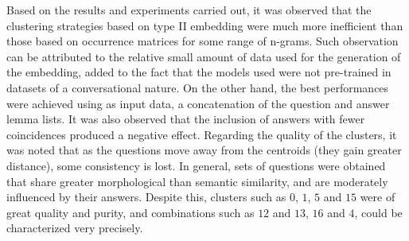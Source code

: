 Based on the results and experiments carried out, it was observed that the clustering strategies based on type II embedding were much more inefficient than those based on occurrence matrices for some range of n-grams. Such observation can be attributed to the relative small amount of data used for the generation of the embedding, added to the fact that the models used were not pre-trained in datasets of a conversational nature.
On the other hand, the best performances were achieved using as input data, a concatenation of the question and answer lemma lists. It was also observed that the inclusion of answers with fewer coincidences produced a negative effect.
Regarding the quality of the clusters, it was noted that as the questions move away from the centroids (they gain greater distance), some consistency is lost. In general, sets of questions were obtained that share greater morphological than semantic similarity, and are moderately influenced by their answers. Despite this, clusters such as $0$, $1$, $5$ and $15$ were of great quality and purity, and combinations such as $12$ and $13$, $16$ and $4$, could be characterized very precisely.